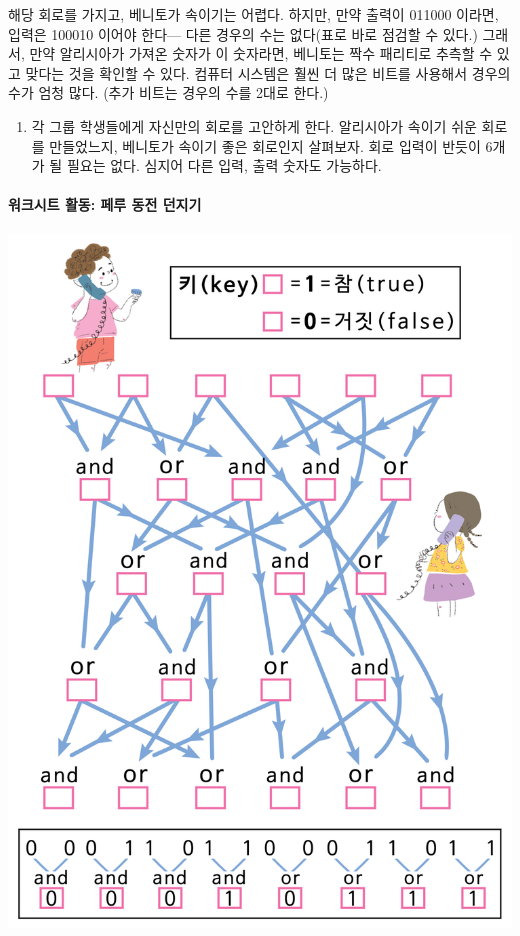 \documentclass[]{article}
\begin{document}
해당 회로를 가지고, 베니토가 속이기는 어렵다. 하지만, 만약 출력이 011000
이라면, 입력은 100010 이어야 한다--- 다른 경우의 수는 없다(표로 바로
점검할 수 있다.) 그래서, 만약 알리시아가 가져온 숫자가 이 숫자라면,
베니토는 짝수 패리티로 추측할 수 있고 맞다는 것을 확인할 수 있다. 컴퓨터
시스템은 훨씬 더 많은 비트를 사용해서 경우의 수가 엄청 많다. (추가
비트는 경우의 수를 2대로 한다.)

\begin{enumerate}
\itemsep1pt\parskip0pt
\item
  각 그룹 학생들에게 자신만의 회로를 고안하게 한다. 알리시아가 속이기
  쉬운 회로를 만들었느지, 베니토가 속이기 좋은 회로인지 살펴보자. 회로
  입력이 반듯이 6개가 될 필요는 없다. 심지어 다른 입력, 출력 숫자도
  가능하다.
\end{enumerate}

\mbox{}\paragraph{워크시트 활동: 페루 동전 던지기}\label{section-242}

\includegraphics{csunplugged/05-part/img/ch18-crypto/17-crypto-06-peruvian-can.png}
\end{document}
